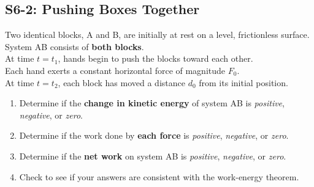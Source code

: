 \documentclass[]{article}
\begin{document}
\begin{PresentSpace}
\vspace{-10pt}
\section*{S6-2: Pushing Boxes Together}
\vspace{-10pt}
Two identical blocks, A and B, are initially at rest on a level, frictionless surface. System AB consists of \textbf{both blocks}. \\
At time $t=t_{1}$, hands begin to push the blocks toward each other. \\
Each hand exerts a constant horizontal force of magnitude $F_{0}$. \\
At time $t=t_{2}$, each block has moved a distance $d_{0}$ from its initial position.
\begin{enumerate}[(1)]
	\large
	\item Determine if the \textbf{change in kinetic energy} of system AB is \textit{positive}, \textit{negative}, or \textit{zero}.
	\item Determine if the work done by \textbf{each force} is \textit{positive}, \textit{negative}, or \textit{zero}.
	\item Determine if the \textbf{net work} on system AB is \textit{positive}, \textit{negative}, or \textit{zero}.
	\item Check to see if your answers are consistent with the work-energy theorem.
\end{enumerate}

\end{PresentSpace}
\end{document}
